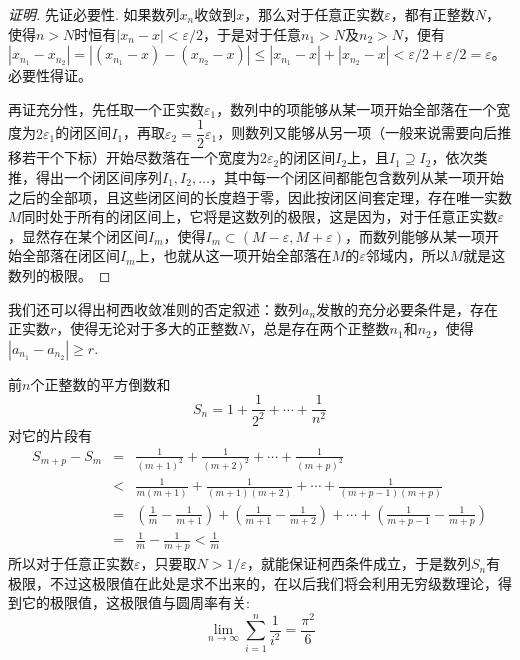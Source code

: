 \begin{proof}[证明]
  先证必要性. 如果数列$x_n$收敛到$x$，那么对于任意正实数$\varepsilon$，都有正整数$N$，使得$n>N$时恒有$|x_n-x|<\varepsilon / 2$，于是对于任意$n_1>N$及$n_2>N$，便有$|x_{n_1}-x_{n_2}|=|(x_{n_1}-x)- (x_{n_2}-x)|\leqslant |x_{n_1}-x|+|x_{n_2}-x|<\varepsilon / 2+\varepsilon / 2 = \varepsilon$。必要性得证。

  再证充分性，先任取一个正实数$\varepsilon_1$，数列中的项能够从某一项开始全部落在一个宽度为$2\varepsilon_1$的闭区间$I_1$，再取$\varepsilon_2 = \dfrac{1}{2}\varepsilon_1$，则数列又能够从另一项（一般来说需要向后推移若干个下标）开始尽数落在一个宽度为$2\varepsilon_2$的闭区间$I_2$上，且$I_1 \supseteq I_2$，依次类推，得出一个闭区间序列$I_1,I_2,\ldots$，其中每一个闭区间都能包含数列从某一项开始之后的全部项，且这些闭区间的长度趋于零，因此按闭区间套定理，存在唯一实数$M$同时处于所有的闭区间上，它将是这数列的极限，这是因为，对于任意正实数$\varepsilon$，显然存在某个闭区间$I_m$，使得$I_m \subset (M-\varepsilon,M+\varepsilon)$，而数列能够从某一项开始全部落在闭区间$I_m$上，也就从这一项开始全部落在$M$的$\varepsilon$邻域内，所以$M$就是这数列的极限。
\end{proof}

我们还可以得出柯西收敛准则的否定叙述：数列$a_n$发散的充分必要条件是，存在正实数$r$，使得无论对于多大的正整数$N$，总是存在两个正整数$n_1$和$n_2$，使得$|a_{n_1}-a_{n_2}| \geqslant r$.

\begin{example}
  前$n$个正整数的平方倒数和
  \[ S_n = 1 + \frac{1}{2^2} + \cdots + \frac{1}{n^2} \]
  对它的片段有
  \begin{eqnarray*}
    S_{m+p}-S_m  & = & \frac{1}{(m+1)^2} + \frac{1}{(m+2)^2} + \cdots + \frac{1}{(m+p)^2} \\
                 & < & \frac{1}{m(m+1)} + \frac{1}{(m+1)(m+2)} + \cdots + \frac{1}{(m+p-1)(m+p)} \\
                 & = & \left( \frac{1}{m} - \frac{1}{m+1} \right) + \left( \frac{1}{m+1} - \frac{1}{m+2} \right) + \cdots + \left( \frac{1}{m+p-1} - \frac{1}{m+p} \right) \\
    & = & \frac{1}{m} - \frac{1}{m+p} < \frac{1}{m}
  \end{eqnarray*}
  所以对于任意正实数$\varepsilon$，只要取$N>1/\varepsilon$，就能保证柯西条件成立，于是数列$S_n$有极限，不过这极限值在此处是求不出来的，在以后我们将会利用无穷级数理论，得到它的极限值，这极限值与圆周率有关:
  \[ \lim_{n \to \infty} \sum_{i=1}^n \frac{1}{i^2} = \frac{\pi^2}{6} \]
\end{example}

